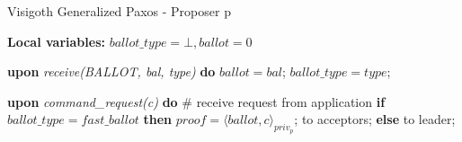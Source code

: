 \begin{algorithm}[h] 
	\caption{Visigoth Generalized Paxos - Proposer p}
	\label{VFT-Prop}
	\textbf{Local variables:} $ballot\_type = \bot, ballot = 0 $
	\begin{algorithmic}[1]
		
		\State \textbf{upon} \textit{receive(BALLOT, bal, type)} \textbf{do} 
		\State \hspace{\algorithmicindent} 
		$ballot = bal$;
		\State \hspace{\algorithmicindent} 
		$ballot\_type = type$;
		\State
		
		\State \textbf{upon} \textit{command\_request(c)} \textbf{do}   \hspace{\algorithmicindent}\hspace{\algorithmicindent}\hspace{\algorithmicindent}\hspace{\algorithmicindent}\# receive request from application
		\State \hspace{\algorithmicindent} \textbf{if} $ballot\_type = fast\_ballot$ \textbf{then}
		\State \hspace{\algorithmicindent}\hspace{\algorithmicindent} $proof = \langle ballot, c \rangle_{priv_p}$;
		\State \hspace{\algorithmicindent}\hspace{\algorithmicindent}  to acceptors;
		\State \hspace{\algorithmicindent} \textbf{else} 
		\State \hspace{\algorithmicindent}\hspace{\algorithmicindent}  to leader;		
	\end{algorithmic}
\end{algorithm}
